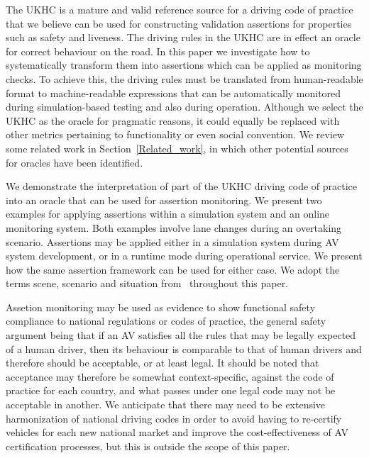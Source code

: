 The UKHC is a mature and valid reference source for a driving code of practice that we believe can be used for constructing validation assertions for properties such as safety and liveness. 
%
The driving rules in the UKHC are in effect an oracle for correct behaviour on the road. In this paper we investigate how to systematically transform them into assertions which can be applied as monitoring checks. To achieve this, the driving rules must be translated from human-readable format to machine-readable expressions that can be automatically monitored during simulation-based testing and also during operation. Although we select the UKHC as the oracle for pragmatic reasons, it could equally be replaced with other metrics pertaining to functionality or even social convention. We review some related work in Section~\ref{Related_work}, in which other potential sources for oracles have been identified.
%
%

We demonstrate the interpretation of part of the UKHC driving code of practice into an oracle that can be used for assertion monitoring. 
%
We present two examples for applying assertions %
within a simulation system and an online monitoring system. Both examples involve lane changes during an overtaking scenario. Assertions may be applied either in a simulation system during AV system development, or in a runtime mode during operational service. We present how the same assertion framework can be used for either case. We adopt the terms scene, scenario and situation from~\cite{Ulbrich2015} throughout this paper. 

Assetion monitoring may be used as evidence to show functional safety compliance to national regulations or codes of practice, the general safety argument being that if an AV satisfies all the rules that may be legally expected of a human driver, then its behaviour is comparable to that of human drivers and therefore should be acceptable, or at least legal. It should be noted that acceptance may therefore be somewhat context-specific, against the code of practice for each country, and what passes under one legal code may not be acceptable in another. We anticipate that there may need to be extensive harmonization of national driving codes in order to avoid having to re-certify vehicles for each new national market and improve the cost-effectiveness of AV certification processes, but this is outside the scope of this paper.

